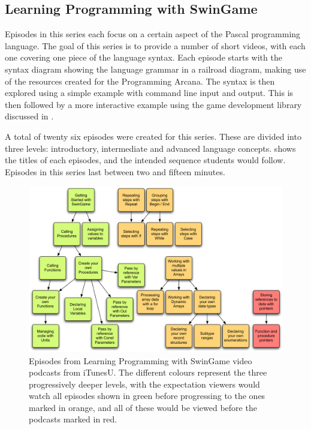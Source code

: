 
\subsection{Learning Programming with SwinGame} %
\label{sub:learning_programming_with_swingame}

Episodes in this series each focus on a certain aspect of the Pascal programming language. The goal of this series is to provide a number of short videos, with each one covering one piece of the language syntax. Each episode starts with the syntax diagram showing the language grammar in a railroad diagram, making use of the resources created for the Programming Arcana. The syntax is then explored using a simple example with command line input and output. This is then followed by a more interactive example using the game development library discussed in .

A total of twenty six episodes were created for this series. These are divided into three levels: introductory, intermediate and advanced language concepts.  shows the titles of each episodes, and the intended sequence students would follow. Episodes in this series last between two and fifteen minutes.

\begin{figure}[thb]
  \centering
  \includegraphics[width=\textwidth]{PodCasts1}
  \caption{Episodes from Learning Programming with SwinGame video podcasts from iTunesU. The different colours represent the three progressively deeper levels, with the expectation viewers would watch all episodes shown in green before progressing to the ones marked in orange, and all of these would be viewed before the podcasts marked in red.}
  \label{fig:podcasts}
\end{figure}

